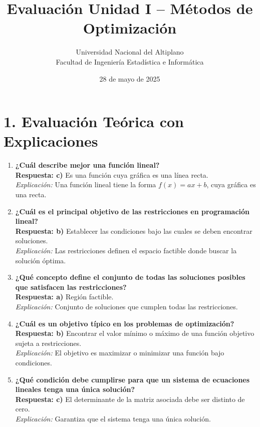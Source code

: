 \documentclass[12pt]{article}
\title{Evaluación Unidad I – Métodos de Optimización}
\author{Universidad Nacional del Altiplano \\ Facultad de Ingeniería Estadística e Informática}
\date{28 de mayo de 2025}
\begin{document}
	\maketitle
	
	\section*{1. Evaluación Teórica con Explicaciones}
	\begin{enumerate}
		\item \textbf{¿Cuál describe mejor una función lineal?} \\
		\textbf{Respuesta: c)} Es una función cuya gráfica es una línea recta. \\
		\textit{Explicación:} Una función lineal tiene la forma $f(x) = ax + b$, cuya gráfica es una recta.
		
		\item \textbf{¿Cuál es el principal objetivo de las restricciones en programación lineal?} \\
		\textbf{Respuesta: b)} Establecer las condiciones bajo las cuales se deben encontrar soluciones. \\
		\textit{Explicación:} Las restricciones definen el espacio factible donde buscar la solución óptima.
		
		\item \textbf{¿Qué concepto define el conjunto de todas las soluciones posibles que satisfacen las restricciones?} \\
		\textbf{Respuesta: a)} Región factible. \\
		\textit{Explicación:} Conjunto de soluciones que cumplen todas las restricciones.
		
		\item \textbf{¿Cuál es un objetivo típico en los problemas de optimización?} \\
		\textbf{Respuesta: b)} Encontrar el valor mínimo o máximo de una función objetivo sujeta a restricciones. \\
		\textit{Explicación:} El objetivo es maximizar o minimizar una función bajo condiciones.
		
		\item \textbf{¿Qué condición debe cumplirse para que un sistema de ecuaciones lineales tenga una única solución?} \\
		\textbf{Respuesta: c)} El determinante de la matriz asociada debe ser distinto de cero. \\
		\textit{Explicación:} Garantiza que el sistema tenga una única solución.
		

\end{enumerate}
\end{document}
